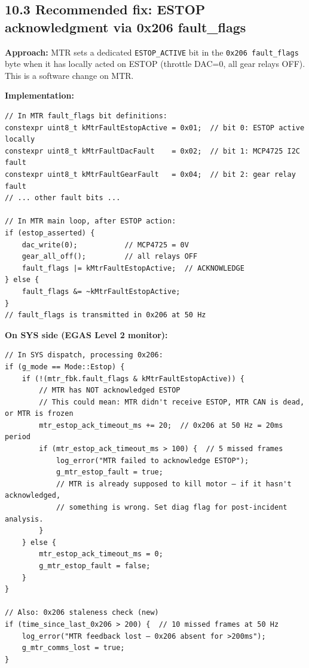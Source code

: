 \documentclass[12pt,a4paper,oneside]{report}
\begin{document}
\subsection{10.3 Recommended fix: ESTOP acknowledgment via 0x206
fault\_flags}\label{recommended-fix-estop-acknowledgment-via-0x206-fault_flags}

\textbf{Approach:} MTR sets a dedicated \texttt{ESTOP\_ACTIVE} bit in the
\texttt{0x206\ fault\_flags} byte when it has locally acted on ESTOP (throttle
DAC=0, all gear relays OFF). This is a software change on MTR.

\textbf{Implementation:}

\begin{verbatim}
// In MTR fault_flags bit definitions:
constexpr uint8_t kMtrFaultEstopActive = 0x01;  // bit 0: ESTOP active locally
constexpr uint8_t kMtrFaultDacFault    = 0x02;  // bit 1: MCP4725 I2C fault
constexpr uint8_t kMtrFaultGearFault   = 0x04;  // bit 2: gear relay fault
// ... other fault bits ...

// In MTR main loop, after ESTOP action:
if (estop_asserted) {
    dac_write(0);           // MCP4725 = 0V
    gear_all_off();         // all relays OFF
    fault_flags |= kMtrFaultEstopActive;  // ACKNOWLEDGE
} else {
    fault_flags &= ~kMtrFaultEstopActive;
}
// fault_flags is transmitted in 0x206 at 50 Hz
\end{verbatim}

\textbf{On SYS side (EGAS Level 2 monitor):}

\begin{verbatim}
// In SYS dispatch, processing 0x206:
if (g_mode == Mode::Estop) {
    if (!(mtr_fbk.fault_flags & kMtrFaultEstopActive)) {
        // MTR has NOT acknowledged ESTOP
        // This could mean: MTR didn't receive ESTOP, MTR CAN is dead, or MTR is frozen
        mtr_estop_ack_timeout_ms += 20;  // 0x206 at 50 Hz = 20ms period
        if (mtr_estop_ack_timeout_ms > 100) {  // 5 missed frames
            log_error("MTR failed to acknowledge ESTOP");
            g_mtr_estop_fault = true;
            // MTR is already supposed to kill motor — if it hasn't acknowledged,
            // something is wrong. Set diag flag for post-incident analysis.
        }
    } else {
        mtr_estop_ack_timeout_ms = 0;
        g_mtr_estop_fault = false;
    }
}

// Also: 0x206 staleness check (new)
if (time_since_last_0x206 > 200) {  // 10 missed frames at 50 Hz
    log_error("MTR feedback lost — 0x206 absent for >200ms");
    g_mtr_comms_lost = true;
}
\end{verbatim}
\end{document}
